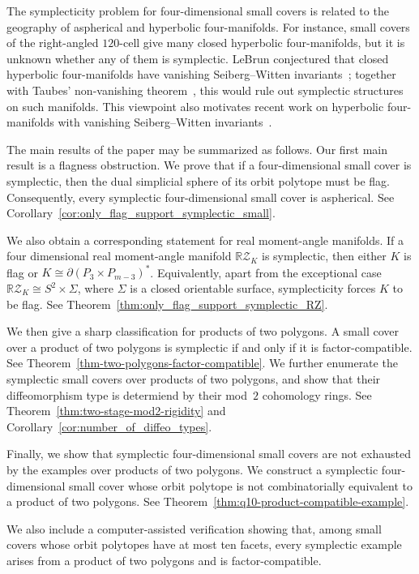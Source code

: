 \documentclass{amsart}
\numberwithin{equation}{section}
\theoremstyle{definition}
\theoremstyle{remark}
\newcommand{\RZ}{\mathbb R\mathcal Z}
\begin{document}
The symplecticity problem for four-dimensional small covers is related to the geography of aspherical and hyperbolic four-manifolds.
For instance, small covers of the right-angled $120$-cell give many closed hyperbolic four-manifolds, but it is unknown whether any of them is symplectic.
LeBrun conjectured that closed hyperbolic four-manifolds have vanishing Seiberg--Witten invariants~\cite{LeBrun2002}; together with Taubes' non-vanishing theorem~\cite{Taubes1994}, this would rule out symplectic structures on such manifolds.
This viewpoint also motivates recent work on hyperbolic four-manifolds with vanishing Seiberg--Witten invariants~\cite{Agol-Lin2020,Stover2026}.

The main results of the paper may be summarized as follows.
Our first main result is a flagness obstruction.
We prove that if a four-dimensional small cover is symplectic, then the dual simplicial sphere of its orbit polytope must be flag.
Consequently, every symplectic four-dimensional small cover is aspherical.
See Corollary~\ref{cor:only_flag_support_symplectic_small}.

We also obtain a corresponding statement for real moment-angle manifolds.
If a four dimensional real moment-angle manifold $\RZ_K$ is symplectic, then either $K$ is flag or $K \cong \partial(P_3 \times P_{m-3})^\ast$.
Equivalently, apart from the exceptional case $\RZ_K \cong S^2 \times \Sigma$, where $\Sigma$ is a closed orientable surface, symplecticity forces $K$ to be flag.
See Theorem~\ref{thm:only_flag_support_symplectic_RZ}.

We then give a sharp classification for products of two polygons.
A small cover over a product of two polygons is symplectic if and only if it is factor-compatible.
See Theorem~\ref{thm-two-polygons-factor-compatible}.
We further enumerate the symplectic small covers over products of two polygons, and show that their diffeomorphism type is determiend by their mod~$2$ cohomology rings.
See Theorem~\ref{thm:two-stage-mod2-rigidity} and Corollary~\ref{cor:number_of_diffeo_types}.

Finally, we show that symplectic four-dimensional small covers are not exhausted by the examples over products of two polygons.
We construct a symplectic four-dimensional small cover whose orbit polytope is not combinatorially equivalent to a product of two polygons.
See Theorem~\ref{thm:q10-product-compatible-example}.

We also include a computer-assisted verification showing that, among small covers whose orbit polytopes have at most ten facets, every symplectic example arises from a product of two polygons and is factor-compatible.
\end{document}
